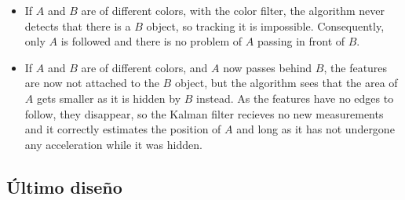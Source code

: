 \begin{itemize}
\item If $A$ and $B$ are of different colors, with the color filter, the algorithm never detects that there is a $ B $ object, so tracking it is impossible. Consequently, only $A$ is followed and there is no problem of $A$ passing in front of $B$.


\item If $A$ and $B$ are of different colors, and $A$ now passes behind $B$, the features are now not attached to the $B$ object, but the algorithm sees that the area of $A$ gets smaller as it is hidden by $B$ instead. As the features have no edges to follow, they disappear, so the Kalman filter recieves no new measurements and it correctly estimates the position of $A$ and long as it has not undergone any acceleration while it was hidden.

\end{itemize}























\subsection{Último diseño}


